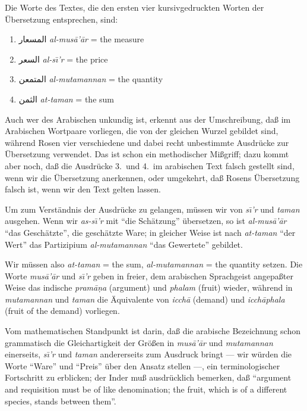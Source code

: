 \documentclass[11pt,a4paper]{article}
\newcommand{\RL}[1]{\beginR#1\endR}
\newcommand{\ar}[1]{{\arabicfont\RL{#1}}}
\newcommand{\enquote}[1]{``#1''}
\begin{document}
Die Worte des Textes, die den ersten vier kursivgedruckten Worten der \"Ubersetzung entsprechen, sind:
\begin{enumerate}
\item \ar{المسعار} \textit{al-mus\=a'\=ar} = the measure
\item \ar{السعر} \textit{al-s\=\i'r} = the price
\item \ar{المتمعن} \textit{al-mutamannan} = the quantity
\item \ar{الثمن} \textit{at-taman} = the sum
\end{enumerate}

Auch wer des Arabischen unkundig ist, erkennt aus der Umschreibung, da\ss{} im Arabischen Wortpaare vorliegen, die von der gleichen Wurzel gebildet sind, w\"ahrend Rosen vier verschiedene und dabei recht unbestimmte Ausdr\"ucke zur \"Ubersetzung verwendet. Das ist schon ein methodischer Mi\ss{}griff; dazu kommt aber noch, da\ss{} die Ausdr\"ucke 3.\ und 4.\ im arabischen Text falsch gestellt sind, wenn wir die \"Ubersetzung anerkennen, oder umgekehrt, da\ss{} Rosens \"Ubersetzung falsch ist, wenn wir den Text gelten lassen.

Um zum Verst\"andnis der Ausdr\"ucke zu gelangen, m\"ussen wir von \textit{s\=\i'r} und \textit{taman} ausgehen. Wenn wir \textit{as-s\=\i'r} mit \enquote{die Sch\"atzung} \"ubersetzen, so ist \textit{al-mus\=a'\=ar} \enquote{das Gesch\"atzte}, die gesch\"atzte Ware; in gleicher Weise ist nach \textit{at-taman} \enquote{der Wert} das Partizipium \textit{al-mutamannan} \enquote{das Gewertete} gebildet.

Wir m\"ussen also \textit{at-taman} = the sum, \textit{al-mutamannan} = the quantity setzen. Die Worte \textit{mus\=a'\=ar} und \textit{s\=\i'r} geben in freier, dem arabischen Sprachgeist angepa\ss{}ter Weise das indische \textit{pram\=a\d{n}a} (argument) und \textit{phalam} (fruit) wieder, w\"ahrend in \textit{mutamannan} und \textit{taman} die \"Aquivalente von \textit{icch\=a} (demand) und \textit{icch\=aphala} (fruit of the demand) vorliegen.

Vom mathematischen Standpunkt ist darin, da\ss{} die arabische Bezeichnung schon grammatisch die Gleichartigkeit der Gr\"o\ss{}en in \textit{mus\=a'\=ar} und \textit{mutamannan} einerseits, \textit{s\=\i'r} und \textit{taman} andererseits zum Ausdruck bringt --- wir w\"urden die Worte \enquote{Ware} und \enquote{Preis} \"uber den Ansatz stellen ---, ein terminologischer Fortschritt zu erblicken; der Inder mu\ss{} ausdr\"ucklich bemerken, da\ss{} \enquote{argument and requisition must be of like denomination; the fruit, which is of a different species, stands between them}.
\end{document}
